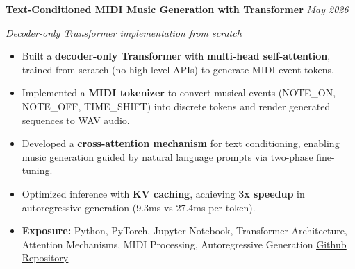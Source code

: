 \noindent\textbf{Text-Conditioned MIDI Music Generation with Transformer} \hfill \textit{May 2026}

\noindent\textit{Decoder-only Transformer implementation from scratch}

\begin{itemize}[leftmargin=0.18in,itemsep=1pt,topsep=2pt]
\item Built a \textbf{decoder-only Transformer} with \textbf{multi-head self-attention}, trained from scratch (no high-level APIs) to generate MIDI event tokens.
\item Implemented a \textbf{MIDI tokenizer} to convert musical events (NOTE_ON, NOTE_OFF, TIME_SHIFT) into discrete tokens and render generated sequences to WAV audio.
\item Developed a \textbf{cross-attention mechanism} for text conditioning, enabling music generation guided by natural language prompts via two-phase fine-tuning.
\item Optimized inference with \textbf{KV caching}, achieving \textbf{3x speedup} in autoregressive generation (9.3ms vs 27.4ms per token).
\item \textbf{Exposure:} Python, PyTorch, Jupyter Notebook, Transformer Architecture, Attention Mechanisms, MIDI Processing, Autoregressive Generation \quad \href{https://github.com/BHK4321/music-generation-transformer}{\underline{Github Repository}}
\end{itemize}
